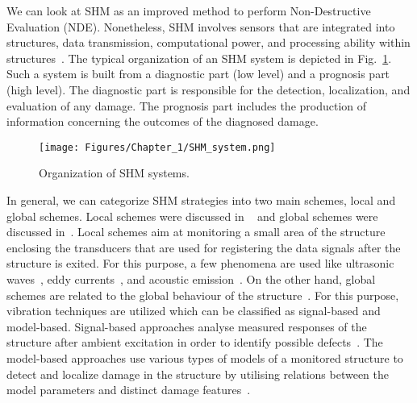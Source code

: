 We can look at SHM as an improved method to perform Non-Destructive Evaluation (NDE). 
Nonetheless, SHM involves sensors that are integrated into structures, data transmission, computational power, and processing ability within structures~\cite{Balageas2010}. 
The typical organization of an SHM system is depicted in Fig.~\ref{fig:SHMsystem}. 
Such a system is built from a diagnostic part (low level) and a prognosis part (high level).
The diagnostic part is responsible for the detection, localization, and evaluation of any damage.
The prognosis part includes the production of information concerning the outcomes of the diagnosed damage.
\begin{figure} [!ht]
	\begin{center}
		\texttt{[image: Figures/Chapter\_1/SHM\_system.png]}
	\end{center}
	\caption{Organization of SHM systems.} 
	\label{fig:SHMsystem}
\end{figure}
In general, we can categorize SHM strategies into two main schemes, local and global schemes. 
Local schemes were discussed in ~\cite{Grimberg2001,Raghavan2007}
and global schemes were discussed in~\cite{Adams2002,Doebling1998,Uhl2004}. 
Local schemes aim at monitoring a small area of the structure enclosing the transducers that are used for registering the data signals after the structure is exited. 
For this purpose, a few phenomena are used like ultrasonic waves~\cite{Raghavan2007}, eddy currents~\cite{Grimberg2001}, and acoustic emission~\cite{Grosse2008}. 
On the other hand, global schemes are related to the global behaviour of the structure~\cite{Balageas2010}. 
For this purpose, vibration techniques are utilized which can be classified as signal-based and model-based.
Signal-based approaches analyse measured responses of the structure after 
ambient excitation in order to identify possible defects~\cite{Stepinski2013}. 
The model-based approaches use various types of models of a monitored structure 
to detect and localize damage in the structure by utilising relations 
between the model parameters and distinct damage features~\cite{Stepinski2013}. 




%
%
%
%